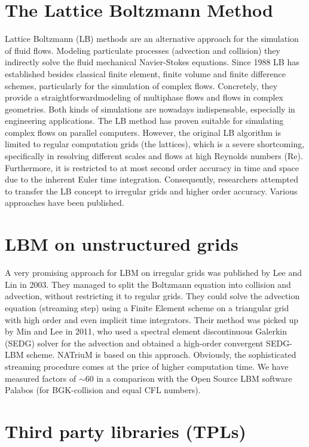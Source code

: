 \hypertarget{index_lbm_sec}{}\section{The Lattice Boltzmann Method}\label{index_lbm_sec}
Lattice Boltzmann (L\-B) methods are an alternative approach for the simulation of fluid flows. Modeling particulate processes (advection and collision) they indirectly solve the fluid mechanical Navier-\/\-Stokes equations. Since 1988 L\-B has established besides classical finite element, finite volume and finite difference schemes, particularly for the simulation of complex flows. Concretely, they provide a straightforwardmodeling of multiphase flows and flows in complex geometries. Both kinds of simulations are nowadays indispensable, especially in engineering applications. The L\-B method has proven suitable for simulating complex flows on parallel computers. However, the original L\-B algorithm is limited to regular computation grids (the lattices), which is a severe shortcoming, specifically in resolving different scales and flows at high Reynolds numbers (Re). Furthermore, it is restricted to at most second order accuracy in time and space due to the inherent Euler time integration. Consequently, researchers attempted to transfer the L\-B concept to irregular grids and higher order accuracy. Various approaches have been published.\hypertarget{index_sedg_sec}{}\section{L\-B\-M on unstructured grids}\label{index_sedg_sec}
A very promising approach for L\-B\-M on irregular grids was published by Lee and Lin in 2003. They managed to split the Boltzmann equation into collision and advection, without restricting it to regular grids. They could solve the advection equation (streaming step) using a Finite Element scheme on a triangular grid with high order and even implicit time integrators. Their method was picked up by Min and Lee in 2011, who used a spectral element discontinuous Galerkin (S\-E\-D\-G) solver for the advection and obtained a high-\/order convergent S\-E\-D\-G-\/\-L\-B\-M scheme. N\-A\-Triu\-M is based on this approach. Obviously, the sophisticated streaming procedure comes at the price of higher computation time. We have measured factors of $\sim$60 in a comparison with the Open Source L\-B\-M software Palabos (for B\-G\-K-\/collision and equal C\-F\-L numbers).\hypertarget{index_tpl_sec}{}\section{Third party libraries (\-T\-P\-Ls)}\label{index_tpl_sec}
